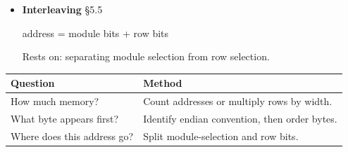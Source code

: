 \documentclass[11pt]{article}
\begin{document}
\begin{keepsection}
\begin{itemize}
\item {}
\textbf{Interleaving} \hfill{\small\color{FAUblue}§5.5}

address = module bits + row bits

Rests on: separating module selection from row selection.
\end{itemize}

\begin{center}\small\begin{tabularx}{\linewidth}{>{\raggedright\arraybackslash}X>{\raggedright\arraybackslash}X}\toprule
\textbf{Question} & \textbf{Method} \\ \midrule
How much memory? & Count addresses or multiply rows by width. \\
What byte appears first? & Identify endian convention, then order bytes. \\
Where does this address go? & Split module-selection and row bits. \\
\bottomrule\end{tabularx}\end{center}
\end{keepsection}
\end{document}
